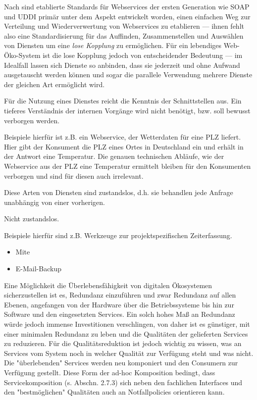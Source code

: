 \documentclass[10pt,a4paper]{article}
\begin{document}
Nach \cite[Seite 653]{ei-sawsdl} sind etablierte Standards für Webservices der ersten Generation wie \ac{SOAP} und \ac{UDDI} primär unter dem Aspekt entwickelt worden, einen einfachen Weg zur Verteilung und Wiederverwertung von Webservices zu etablieren --- ihnen fehlt also eine Standardisierung für das Auffinden, Zusammenstellen und Auswählen von Diensten um eine \emph{lose Kopplung} zu ermöglichen. Für ein lebendiges Web-Öko-System ist die lose Kopplung jedoch von entscheidender Bedeutung --- im Idealfall lassen sich Dienste so anbinden, dass sie jederzeit und ohne Aufwand ausgetauscht werden können und sogar die parallele Verwendung mehrere Dienste der gleichen Art ermöglicht wird.


Für die Nutzung eines Dienstes reicht die Kenntnis der Schnittstellen aus. Ein tieferes Verständnis
der internen Vorgänge wird nicht benötigt, bzw. soll bewusst verborgen werden. \cite{hhxmlwssoa}

Beispiele hierfür ist z.B. ein Webservice, der Wetterdaten für eine PLZ liefert. Hier gibt der Konsument die PLZ eines Ortes in Deutschland ein und erhält in der Antwort eine Temperatur. Die genauen technischen Abläufe, wie der Webservice aus der PLZ eine Temperatur ermittelt bleiben für den Konsumenten verborgen und sind für diesen auch irrelevant.

Diese Arten von Diensten sind zustandslos, d.h. sie behandlen jede Anfrage unabhängig von einer vorherigen.


Nicht zustandslos.

Beispiele hierfür sind z.B. Werkzeuge zur projektspezifischen Zeiterfassung. 


\begin{itemize}
\item Mite
\item E-Mail-Backup
\end{itemize}


Eine Möglichkeit die Überlebensfähigkeit von digitalen Ökosystemen sicherzustellen
ist es, Redundanz einzuführen und zwar Redundanz auf allen Ebenen, angefangen
von der Hardware über die Betriebssysteme bis hin zur Software und den
eingesetzten Services. Ein solch hohes Maß an Redundanz würde jedoch immense
Investitionen verschlingen, von daher ist es günstiger, mit einer minimalen Redundanz
zu leben und die Qualitäten der gelieferten Services zu reduzieren. Für die
Qualitätsreduktion ist jedoch wichtig zu wissen, was an Services vom System noch
in welcher Qualität zur Verfügung steht und was nicht. Die "überlebenden" Services
werden neu komponiert und den Consumern zur Verfügung gestellt. Diese Form der
ad-hoc Komposition bedingt, dass Servicekomposition (s. Abschn. 2.7.3) sich neben
den fachlichen Interfaces und den "bestmöglichen" Qualitäten auch an Notfallpolicies
orientieren kann. \cite{mkulss}
\end{document}
